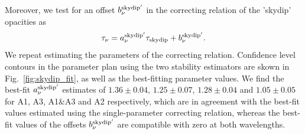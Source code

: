 Moreover, we test for an offset $b_\nu^{\rm{skydip}'}$ in the
correcting relation of the 'skydip' opacities as 
\begin{equation}  
  \tau_\nu =  a_\nu^{\rm{skydip}'}\tau_{\rm{skydip}} + b_\nu^{\rm{skydip}'}.      
\end{equation}
We repeat estimating the parameters of the correcting
relation. Confidence level contours in the parameter plan using the
two stability estimators are skown in Fig.~\ref{fig:skydip_fit}, as
well as the
best-fitting parameter values.
We find the best-fit $a_\nu^{\rm{skydip}'}$ estimates of
$1.36 \pm 0.04$,
$1.25 \pm 0.07$,
$1.28 \pm 0.04$ and
$1.05 \pm 0.05$ for A1, A3, A1$\&$A3 and A2 respectively, which are in
agreement with the best-fit values estimated using the single-parameter
correcting relation, whereas the best-fit values of the offsets
$b_\nu^{\rm{skydip}'}$ are compatible with zero at both wavelengths.


